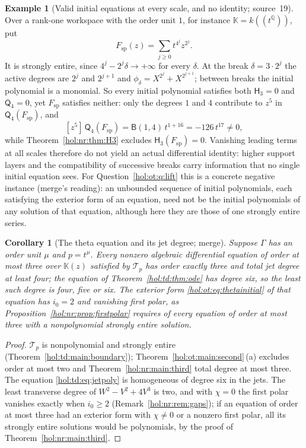\documentclass[11pt]{article}
\numberwithin{equation}{section}
\newtheorem{corollary}[theorem]{Corollary}
\theoremstyle{definition}
\newtheorem{example}[theorem]{Example}
\theoremstyle{remark}
\newcommand{\Q}{\mathbb Q}
\newcommand{\KK}{\mathbb K}
\begin{document}
\begin{example}[Valid initial equations at every scale, and no identity;
source~19]\label{hol:nr:ex:sparse}
Over a rank-one workspace with the order unit $1$, for instance
$\KK=k((t^\Q))$, put
\begin{equation}\label{hol:nr:eq:sparse}
 F_{\mathrm{sp}}(z)=\sum_{j\ge0}t^{4^j}z^{2^j}.
\end{equation}
It is strongly entire, since $4^j-2^j\delta\to+\infty$ for every $\delta$. At
the break $\delta=3\cdot2^j$ the active degrees are $2^j$ and $2^{j+1}$ and
$\phi_\delta=X^{2^j}+X^{2^{j+1}}$; between breaks the initial polynomial is a
monomial. So every initial polynomial satisfies both $\mathsf H_3=0$ and
$\mathsf Q_4=0$, yet $F_{\mathrm{sp}}$ satisfies neither: only the degrees $1$
and $4$ contribute to $z^5$ in $\mathsf Q_4(F_{\mathrm{sp}})$, and
\begin{equation}\label{hol:nr:eq:residual}
 [z^5]\,\mathsf Q_4(F_{\mathrm{sp}})=\mathsf B(1,4)\,t^{1+16}=-126\,t^{17}\ne0,
\end{equation}
while Theorem~\ref{hol:nr:thm:H3} excludes $\mathsf H_3(F_{\mathrm{sp}})=0$.
Vanishing leading terms at all scales therefore do not yield an actual
differential identity: higher support layers and the compatibility of
successive breaks carry information that no single initial equation sees. For
Question~\ref{hol:ot:q:lift} this is a concrete negative instance (merge's
reading): an unbounded sequence of initial polynomials, each satisfying the
exterior form of an equation, need not be the initial polynomials of any
solution of that equation, although here they are those of one strongly entire
series.
\end{example}

\begin{corollary}[The theta equation and its jet degree; merge]
\label{hol:nr:cor:theta}
Suppose $\Gamma$ has an order unit $\mu$ and $p=t^\mu$. Every nonzero algebraic
differential equation of order at most three over $\KK(z)$ satisfied by
$\mathcal T_p$ has order exactly three and total jet degree at least four; the
equation of Theorem~\ref{hol:td:thm:ode} has degree six, so the least such
degree is four, five or six. The exterior form \eqref{hol:ot:eq:thetainitial}
of that equation has $i_0=2$ and vanishing first polar, as
Proposition~\ref{hol:nr:prop:firstpolar} requires of every equation of order at
most three with a nonpolynomial strongly entire solution.
\end{corollary}

\begin{proof}
$\mathcal T_p$ is nonpolynomial and strongly entire
(Theorem~\ref{hol:td:main:boundary}); Theorem~\ref{hol:ot:main:second}\,(a)
excludes order at most two and Theorem~\ref{hol:nr:main:third} total degree at
most three. The equation \eqref{hol:td:eq:jetpoly} is homogeneous of degree six
in the jets. The least transverse degree of $W^2-V^2+4V^3$ is two, and with
$\chi=0$ the first polar vanishes exactly when $i_0\ge2$
(Remark~\ref{hol:nr:rem:gaps}); if an equation of order at most three had an
exterior form with $\chi\ne0$ or a nonzero first polar, all its strongly entire
solutions would be polynomials, by the proof of
Theorem~\ref{hol:nr:main:third}.
\end{proof}
\end{document}

